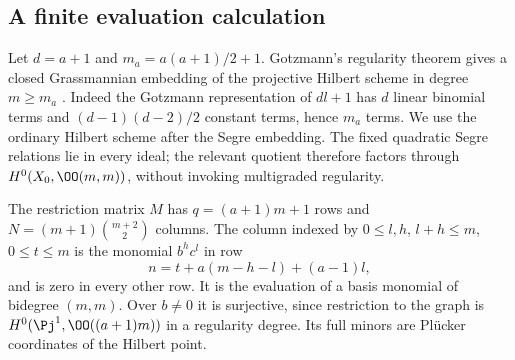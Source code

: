 \subsection{A finite evaluation calculation}
Let $d=a+1$ and $m_a=a(a+1)/2+1$. Gotzmann's regularity theorem gives
a closed Grassmannian embedding of the projective Hilbert scheme in
degree $m\geq m_a$ \cite{Gotzmann171}. Indeed the Gotzmann
representation of $dl+1$ has $d$ linear binomial terms and
$(d-1)(d-2)/2$ constant terms, hence $m_a$ terms. We use the ordinary
Hilbert scheme after the Segre embedding. The fixed quadratic Segre
relations lie in every ideal; the relevant quotient therefore factors
through $H^0(X_0,\OO(m,m))$, without invoking multigraded regularity.

The restriction matrix $M$ has $q=(a+1)m+1$ rows and
$N=(m+1)\binom{m+2}{2}$ columns. The column indexed by
$0\leq l,h$, $l+h\leq m$, $0\leq t\leq m$ is the monomial
$b^hc^l$ in row
\[
 n=t+a(m-h-l)+(a-1)l,
\]
and is zero in every other row. It is the evaluation of a basis
monomial of bidegree $(m,m)$. Over $b\ne0$ it is surjective, since
restriction to the graph is $H^0(\Pj^1,\OO((a+1)m))$ in a regularity
degree. Its full minors are Pl\"ucker coordinates of the Hilbert point.

